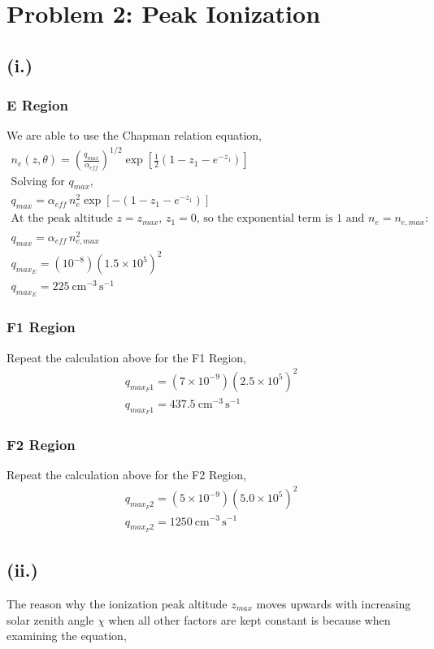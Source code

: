 \documentclass[11pt]{article}
\begin{document}
\newpage
\section*{Problem 2: Peak Ionization}
\subsection*{(i.)}
\subsubsection*{E Region}
We are able to use the Chapman relation equation,
\begin{gather*}
n_e(z,\theta) = \left(\frac{q_{max}}{\alpha_{eff}}\right)^{1/2} \exp\!\left[\frac{1}{2}\left(1 - z_1 - e^{-z_1}\right)\right] \\
\text{Solving for $q_{max}$,} \\
q_{max} = \alpha_{eff}\, n_e^2 \exp\!\left[-\left(1 - z_1 - e^{-z_1}\right)\right] \\
\text{At the peak altitude $z = z_{max}$, $z_1 = 0$, so the exponential term is 1 and $n_e = n_{e,max}$:} \\
q_{max} = \alpha_{eff}\, n_{e,max}^2 \\
q_{max_E} = (10^{-8})(1.5\times10^{5})^2 \\
\boxed{q_{max_E}= 225~\mathrm{cm^{-3}\,s^{-1}}}
\end{gather*}
\subsubsection*{F1 Region}
Repeat the calculation above for the F1 Region,
\begin{gather*}
q_{max_F1} = (7\times10^{-9})(2.5\times10^{5})^2 \\
\boxed{q_{max_F1}= 437.5~\mathrm{cm^{-3}\,s^{-1}}}
\end{gather*}
\subsubsection*{F2 Region}
Repeat the calculation above for the F2 Region,
\begin{gather*}
q_{max_F2} = (5\times10^{-9})(5.0\times10^{5})^2 \\
\boxed{q_{max_F2}= 1250~\mathrm{cm^{-3}\,s^{-1}}}
\end{gather*}

\subsection*{(ii.)}
The reason why the ionization peak altitude $z_{max}$ moves upwards with increasing solar zenith angle
$\chi$ when all other factors are kept constant is because when examining the equation,
\end{document}
